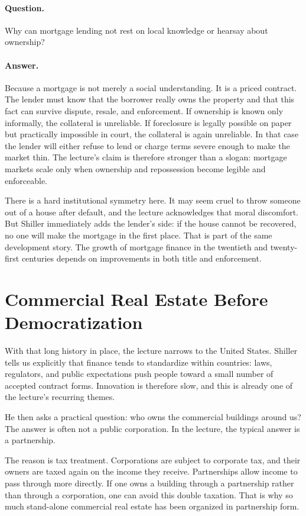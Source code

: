 \paragraph{Question.} Why can mortgage lending not rest on local knowledge or hearsay about ownership?

\paragraph{Answer.} Because a mortgage is not merely a social understanding. It is a priced contract. The lender must know that the borrower really owns the property and that this fact can survive dispute, resale, and enforcement. If ownership is known only informally, the collateral is unreliable. If foreclosure is legally possible on paper but practically impossible in court, the collateral is again unreliable. In that case the lender will either refuse to lend or charge terms severe enough to make the market thin. The lecture's claim is therefore stronger than a slogan: mortgage markets scale only when ownership and repossession become legible and enforceable.

There is a hard institutional symmetry here. It may seem cruel to throw someone out of a house after default, and the lecture acknowledges that moral discomfort. But Shiller immediately adds the lender's side: if the house cannot be recovered, no one will make the mortgage in the first place. That is part of the same development story. The growth of mortgage finance in the twentieth and twenty-first centuries depends on improvements in both title and enforcement.

\section{Commercial Real Estate Before Democratization}

With that long history in place, the lecture narrows to the United States. Shiller tells us explicitly that finance tends to standardize within countries: laws, regulators, and public expectations push people toward a small number of accepted contract forms. Innovation is therefore slow, and this is already one of the lecture's recurring themes.

He then asks a practical question: who owns the commercial buildings around us? The answer is often not a public corporation. In the lecture, the typical answer is a partnership.

The reason is tax treatment. Corporations are subject to corporate tax, and their owners are taxed again on the income they receive. Partnerships allow income to pass through more directly. If one owns a building through a partnership rather than through a corporation, one can avoid this double taxation. That is why so much stand-alone commercial real estate has been organized in partnership form.

